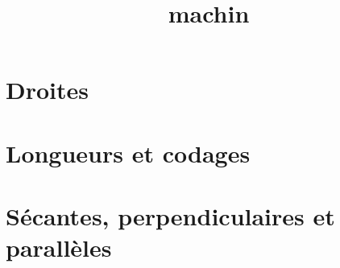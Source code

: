 \documentclass[12pt,a4paper]{article}
\date{}
\title{machin}
\begin{document}
%
%


%

\section{Droites}



\newpage

\section{Longueurs et codages}



\section{Sécantes, perpendiculaires et parallèles}


\end{document}

